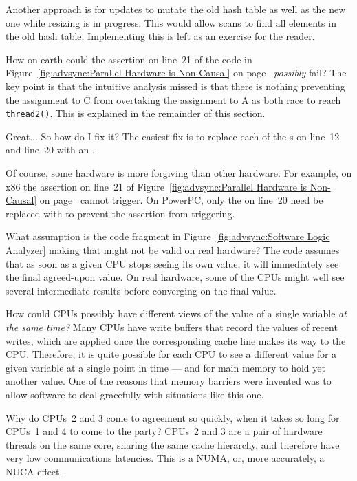 	Another approach is for updates to mutate the old hash
	table as well as the new one while resizing is in
	progress.
	This would allow scans to find all elements in the old
	hash table.
	Implementing this is left as an exercise for the reader.

\QuickQ{}
	How on earth could the assertion on line~21 of the code in
	Figure~\ref{fig:advsync:Parallel Hardware is Non-Causal} on
	page~\pageref{fig:advsync:Parallel Hardware is Non-Causal}
	\emph{possibly} fail?
\QuickA{}
	The key point is that the intuitive analysis missed is that
	there is nothing preventing the assignment to C from overtaking
	the assignment to A as both race to reach {\tt thread2()}.
	This is explained in the remainder of this section.

\QuickQ{}
	Great...  So how do I fix it?
\QuickA{}
	The easiest fix is to replace each of the s on
	line~12 and line~20 with an .

	Of course, some hardware is more forgiving than other hardware.
	For example, on x86 the assertion on line~21 of
	Figure~\ref{fig:advsync:Parallel Hardware is Non-Causal} on
	page~\pageref{fig:advsync:Parallel Hardware is Non-Causal}
	cannot trigger.
	On PowerPC, only the  on line~20 need be
	replaced with  to prevent the assertion from
	triggering.

\QuickQ{}
	What assumption is the code fragment
	in Figure~\ref{fig:advsync:Software Logic Analyzer}
	making that might not be valid on real hardware?
\QuickA{}
	The code assumes that as soon as a given CPU stops
	seeing its own value, it will immediately see the
	final agreed-upon value.
	On real hardware, some of the CPUs might well see several
	intermediate results before converging on the final value.

\QuickQ{}
	How could CPUs possibly have different views of the
	value of a single variable \emph{at the same time?}
\QuickA{}
	Many CPUs have write buffers that record the values of
	recent writes, which are applied once the corresponding
	cache line makes its way to the CPU.
	Therefore, it is quite possible for each CPU to see a
	different value for a given variable at a single point
	in time --- and for main memory to hold yet another value.
	One of the reasons that memory barriers were invented was
	to allow software to deal gracefully with situations like
	this one.

\QuickQ{}
	Why do CPUs~2 and 3 come to agreement so quickly, when it
	takes so long for CPUs~1 and 4 to come to the party?
\QuickA{}
	CPUs~2 and 3 are a pair of hardware threads on the same
	core, sharing the same cache hierarchy, and therefore have
	very low communications latencies.
	This is a NUMA, or, more accurately, a NUCA effect.

